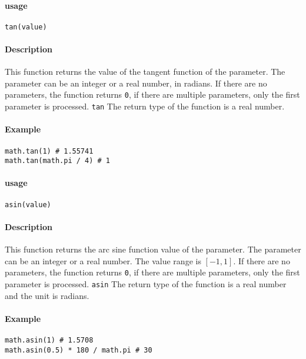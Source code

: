 
\paragraph{usage}
\begin{lstlisting}[language=berry, numbers=none]
tan(value)
\end{lstlisting}

\paragraph{Description}
This function returns the value of the tangent function of the parameter. The parameter can be an integer or a real number, in radians. If there are no parameters, the function returns \texttt{0}, if there are multiple parameters, only the first parameter is processed. \texttt{tan} The return type of the function is a real number.

\paragraph{Example}
\begin{lstlisting}[language=berry, numbers=none]
math.tan(1) # 1.55741
math.tan(math.pi / 4) # 1
\end{lstlisting}%

\paragraph{usage}
\begin{lstlisting}[language=berry, numbers=none]
asin(value)
\end{lstlisting}

\paragraph{Description}
This function returns the arc sine function value of the parameter. The parameter can be an integer or a real number. The value range is $[-1,1]$. If there are no parameters, the function returns \texttt{0}, if there are multiple parameters, only the first parameter is processed. \texttt{asin} The return type of the function is a real number and the unit is radians.

\paragraph{Example}
\begin{lstlisting}[language=berry, numbers=none]
math.asin(1) # 1.5708
math.asin(0.5) * 180 / math.pi # 30
\end{lstlisting}

